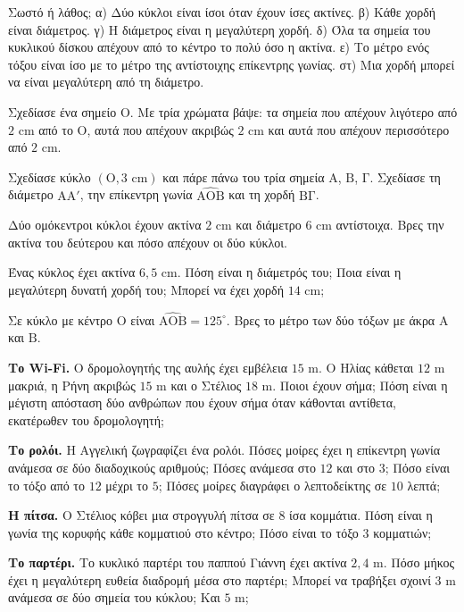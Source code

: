 \ex Σωστό ή λάθος; α) Δύο κύκλοι είναι ίσοι όταν έχουν ίσες ακτίνες. β) Κάθε χορδή είναι διάμετρος. γ) Η διάμετρος είναι η μεγαλύτερη χορδή. δ) Όλα τα σημεία του κυκλικού δίσκου απέχουν από το κέντρο το πολύ όσο η ακτίνα. ε) Το μέτρο ενός τόξου είναι ίσο με το μέτρο της αντίστοιχης επίκεντρης γωνίας. στ) Μια χορδή μπορεί να είναι μεγαλύτερη από τη διάμετρο.

\ex Σχεδίασε ένα σημείο $\mathrm{Ο}$. Με τρία χρώματα βάψε: τα σημεία που απέχουν λιγότερο από $2$ cm από το $\mathrm{Ο}$, αυτά που απέχουν ακριβώς $2$ cm και αυτά που απέχουν περισσότερο από $2$ cm.

\ex Σχεδίασε κύκλο $(\mathrm{Ο},3\text{ cm})$ και πάρε πάνω του τρία σημεία $\mathrm{Α}$, $\mathrm{Β}$, $\mathrm{Γ}$. Σχεδίασε τη διάμετρο $\mathrm{ΑΑ'}$, την επίκεντρη γωνία $\widehat{\mathrm{ΑΟΒ}}$ και τη χορδή $\mathrm{ΒΓ}$.

\ex Δύο ομόκεντροι κύκλοι έχουν ακτίνα $2$ cm και διάμετρο $6$ cm αντίστοιχα. Βρες την ακτίνα του δεύτερου και πόσο απέχουν οι δύο κύκλοι.

\ex Ένας κύκλος έχει ακτίνα $6{,}5$ cm. Πόση είναι η διάμετρός του; Ποια είναι η μεγαλύτερη δυνατή χορδή του; Μπορεί να έχει χορδή $14$ cm;

\ex Σε κύκλο με κέντρο $\mathrm{Ο}$ είναι $\widehat{\mathrm{ΑΟΒ}}=125^\circ$. Βρες το μέτρο των δύο τόξων με άκρα $\mathrm{Α}$ και $\mathrm{Β}$.


\ex \textbf{Το Wi-Fi.} Ο δρομολογητής της αυλής έχει εμβέλεια $15$ m. Ο Ηλίας κάθεται $12$ m μακριά, η Ρήνη ακριβώς $15$ m και ο Στέλιος $18$ m. Ποιοι έχουν σήμα; Πόση είναι η μέγιστη απόσταση δύο ανθρώπων που έχουν σήμα όταν κάθονται αντίθετα, εκατέρωθεν του δρομολογητή;

\ex \textbf{Το ρολόι.} Η Αγγελική ζωγραφίζει ένα ρολόι. Πόσες μοίρες έχει η επίκεντρη γωνία ανάμεσα σε δύο διαδοχικούς αριθμούς; Πόσες ανάμεσα στο $12$ και στο $3$; Πόσο είναι το τόξο από το $12$ μέχρι το $5$; Πόσες μοίρες διαγράφει ο λεπτοδείκτης σε $10$ λεπτά;

\ex \textbf{Η πίτσα.} Ο Στέλιος κόβει μια στρογγυλή πίτσα σε $8$ ίσα κομμάτια. Πόση είναι η γωνία της κορυφής κάθε κομματιού στο κέντρο; Πόσο είναι το τόξο $3$ κομματιών;

\ex \textbf{Το παρτέρι.} Το κυκλικό παρτέρι του παππού Γιάννη έχει ακτίνα $2{,}4$ m. Πόσο μήκος έχει η μεγαλύτερη ευθεία διαδρομή μέσα στο παρτέρι; Μπορεί να τραβήξει σχοινί $3$ m ανάμεσα σε δύο σημεία του κύκλου; Και $5$ m;

